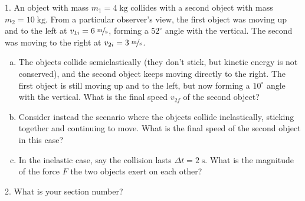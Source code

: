 \documentclass{article}
\begin{document}
\insertTitle

1. An object with mass $m_1 = 4\phantom{.}\text{kg}$ collides with a second object with mass $m_2 = 10\phantom{.}\text{kg}$. From a particular observer's view, the first object was moving up and to the left at $v_{1i} = 6\phantom{.}\nicefrac{\text{m}}{\text{s}}$, forming a $52^\circ$ angle with the vertical. The second was moving to the right at $v_{2i} = 3\phantom{.}\nicefrac{\text{m}}{\text{s}}$.

\begin{enumerate}[(a)]
    \item The objects collide semielastically (they don't stick, but kinetic energy is not conserved), and the second object keeps moving directly to the right. The first object is still moving up and to the left, but now forming a $10^\circ$ angle with the vertical. What is the final speed $v_{2f}$ of the second object?

\vfill

    \item Consider instead the scenario where the objects collide inelastically, sticking together and continuing to move. What is the final speed of the second object in this case?

\vfill

    \item In the inelastic case, say the collision lasts $\Delta t = 2\phantom{.}\text{s}$. What is the magnitude of the force $F$ the two objects exert on each other?
\end{enumerate}
\vfill

2. What is your section number?
\end{document}
